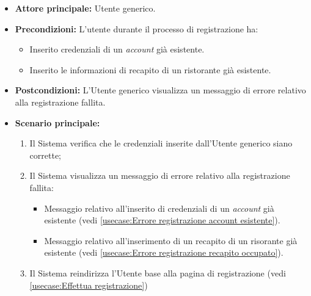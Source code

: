 \label{usecase:Registrazione fallita}

\begin{itemize}
	\item \textbf{Attore principale:} Utente generico.
	\item \textbf{Precondizioni:}
    L'utente durante il processo di registrazione ha:
    \begin{itemize}
        \item Inserito credenziali di un \textit{account} già esistente.
        \item Inserito le informazioni di recapito di un ristorante già esistente.
    \end{itemize}
	\item \textbf{Postcondizioni:} L'Utente generico visualizza un messaggio di errore relativo alla registrazione fallita.

	\item \textbf{Scenario principale:}
	\begin{enumerate}
        \item Il Sistema verifica che le credenziali inserite dall'Utente generico siano corrette;
        \item Il Sistema visualizza un messaggio di errore relativo alla registrazione fallita:
            \begin{itemize}
                \item Messaggio relativo all'inserito di credenziali di un \textit{account} già esistente (vedi \autoref{usecase:Errore registrazione account esistente}).
                \item Messaggio relativo all'inserimento di un recapito  di un risorante già esistente (vedi \autoref{usecase:Errore registrazione recapito occupato}).
            \end{itemize}
        \item Il Sistema reindirizza l'Utente base alla pagina di registrazione (vedi \autoref{usecase:Effettua registrazione})
    \end{enumerate}
	
\end{itemize}


